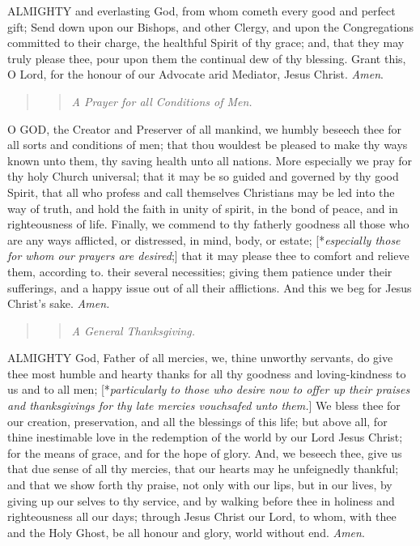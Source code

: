 ALMIGHTY
and everlasting God, from whom cometh every good and perfect gift; Send
down upon our Bishops, and other Clergy, and upon the Congregations committed
to their charge, the healthful Spirit of thy grace; and, that they may
truly please thee, pour upon them the continual dew of thy blessing. Grant
this, O Lord, for the honour of our Advocate arid Mediator, Jesus Christ.
\emph{Amen}.

\begin{quote}

\begin{quote}

\emph{A
Prayer for all Conditions of Men.}

\end{quote}

\end{quote}

O
GOD, the Creator and Preserver of all mankind, we humbly beseech thee
for all sorts and conditions of men; that thou wouldest be pleased to
make thy ways known unto them, thy saving health unto all nations. More
especially we pray for thy holy Church universal; that it may be so guided
and governed by thy good Spirit, that all who profess and call themselves
Christians may be led into the way of truth, and hold the faith in unity
of spirit, in the bond of peace, and in righteousness of life. Finally,
we commend to thy fatherly goodness all those who are any ways afflicted,
or distressed, in mind, body, or estate; [*\emph{especially
those for whom our prayers are desired};] that it may please thee
to comfort and relieve them, according to. their several necessities;
giving them patience under their sufferings, and a happy issue out of
all their afflictions. And this we beg for Jesus Christ’s sake.
\emph{Amen.}

\begin{quote}

\begin{quote}

\emph{A
General Thanksgiving.}

\end{quote}

\end{quote}

ALMIGHTY
God, Father of all mercies, we, thine unworthy servants, do give thee
most humble and hearty thanks for all thy goodness and loving-kindness
to us and to all men; [*\emph{particularly to
those who desire now to offer up their praises and thanksgivings for thy
late mercies vouchsafed unto them.}] We bless thee for our creation,
preservation, and all the blessings of this life; but above all, for thine
inestimable love in the redemption of the world by our Lord Jesus Christ;
for the means of grace, and for the hope of glory. And, we beseech thee,
give us that due sense of all thy mercies, that our hearts may he unfeignedly
thankful; and that we show forth thy praise, not only with our lips, but
in our lives, by giving up our selves to thy service, and by walking before
thee in holiness and righteousness all our days; through Jesus Christ
our Lord, to whom, with thee and the Holy Ghost, be all honour and glory,
world without end. \emph{Amen}.

